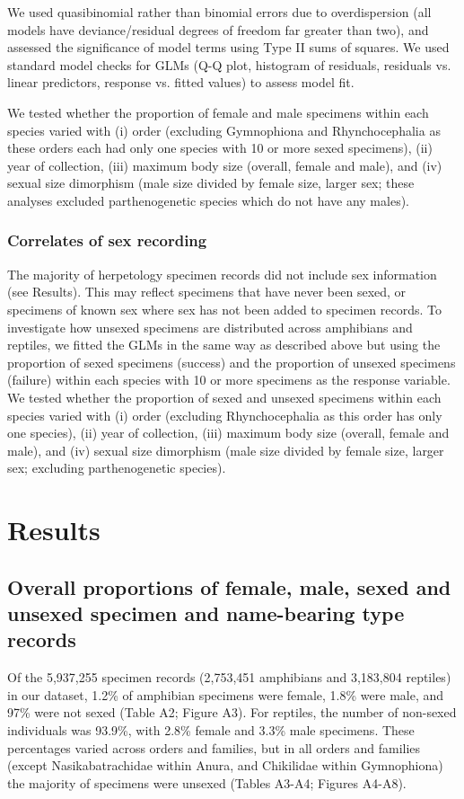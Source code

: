 \documentclass[a4paper, 12pt]{article}
\begin{document}
We used quasibinomial rather than binomial errors due to overdispersion (all models have deviance/residual degrees of freedom far greater than two), and assessed the significance of model terms using Type II sums of squares. 
We used standard model checks for GLMs (Q-Q plot, histogram of residuals, residuals vs. linear predictors, response vs. fitted values) to assess model fit. 

We tested whether the proportion of female and male specimens within each species varied with (i) order (excluding Gymnophiona and Rhynchocephalia as these orders each had only one species with 10 or more sexed specimens), (ii) year of collection, (iii) maximum body size (overall, female and male), and (iv) sexual size dimorphism (male size divided by female size, larger sex; these analyses excluded parthenogenetic species which do not have any males). 

\subsubsection{Correlates of sex recording}
The majority of herpetology specimen records did not include sex information (see Results). 
This may reflect specimens that have never been sexed, or specimens of known sex where sex has not been added to specimen records. 
To investigate how unsexed specimens are distributed across amphibians and reptiles, we fitted the GLMs in the same way as described above but using the proportion of sexed specimens (success) and the proportion of unsexed specimens (failure) within each species with 10 or more specimens as the response variable. 
We tested whether the proportion of sexed and unsexed specimens within each species varied with (i) order (excluding Rhynchocephalia as this order has only one species), (ii) year of collection, (iii) maximum body size (overall, female and male), and (iv) sexual size dimorphism (male size divided by female size, larger sex; excluding parthenogenetic species).

\section{Results}

\subsection{Overall proportions of female, male, sexed and unsexed specimen and name-bearing type records}
Of the 5,937,255 specimen records (2,753,451 amphibians and 3,183,804 reptiles) in our dataset, 1.2\% of amphibian specimens were female, 1.8\% were male, and 97\% were not sexed (Table A2; Figure A3). 
For reptiles, the number of non-sexed individuals was 93.9\%, with 2.8\% female and 3.3\% male specimens. 
These percentages varied across orders and families, but in all orders and families (except Nasikabatrachidae within Anura, and Chikilidae within Gymnophiona) the majority of specimens were unsexed (Tables A3-A4; Figures A4-A8).
\end{document}
